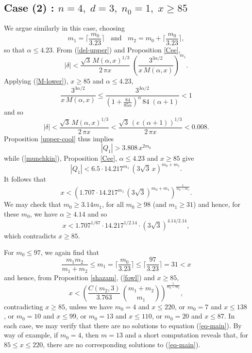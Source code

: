 \subsection{Case (2) : $n=4, \; d=3, \;  n_0=1, \; x \geq 85$}

We argue similarly in this case, choosing
$$
m_1 = \Big\lceil \frac{m_0}{3.23} \Big\rceil \; \; \mbox{ and } \; \; m_2 = m_0+  \Big\lceil \frac{m_0}{3.23} \Big\rceil,
$$
so that $\alpha \leq 4.23$.
From (\ref{del-upper}) and   Proposition \ref{Cee}, 
$$
|\delta| < \frac{\sqrt{3} \, M(\alpha,x)^{1/3}}{2 \, \pi x} \; \left( \frac{3^{3\alpha/2} }{x \, M(\alpha,x)} \right)^{m_1}.
$$
Applying (\ref{M-lower}), $x \geq 85$ and $\alpha \leq 4.23$, 
$$
 \frac{3^{3\alpha/2} }{x \, M(\alpha,x)} \leq \frac{3^{3\alpha/2} }{\left( 1 + \frac{84}{85 \alpha} \right)^\alpha \, 84 \; (\alpha+1)} < 1
$$
and so 
$$
|\delta| < \frac{\sqrt{3} \, M(\alpha,x)^{1/3}}{2 \, \pi x}  < 
\frac{\sqrt{3} \,(e \, (\alpha+1))^{1/3}}{2 \,\pi x}  < 0.008.
$$
Proposition \ref{upper-cool} thus implies 
\begin{equation} \label{fowl}
|Q_1| > 3.808 \, x^{2 m_0}
\end{equation}
while (\ref{munchkin}), Proposition \ref{Cee}, $\alpha \leq 4.23$ and $x \geq 85$ give
$$
|Q_1| < 6.5 \cdot 14.217^{m_1}  \, (3 \sqrt{3} \, x)^{m_0+m_1}.
$$
 It follows that
\begin{equation} \label{kite3}
x < \left( 1.707 \cdot 14.217^{m_1}  \, (3 \sqrt{3})^{m_0+m_1} \right)^{\frac{1}{m_0-m_1}}.
\end{equation}
 We may check that $m_0 \geq 3.14 m_1$, for all $m_0 \geq 98$ (and $m_1 \geq 31$) and hence, for these $m_0$, we have $\alpha \geq 4.14$ and so
 $$
 x < 1.707^{1/67} \cdot 14.217^{1/2.14} \cdot (3 \sqrt{3})^{4.14/2.14},
 $$
 which contradicts $x \geq 85$.
 
 For $m_0 \leq 97$, we again find that
 $$
\frac{m_1m_2}{m_1+m_2} \leq m_1 = \Big\lceil \frac{m_0}{3.23} \Big\rceil \leq   \Big\lceil \frac{97}{3.23} \Big\rceil = 31 < x
$$
 and hence, from Proposition \ref{shazam}, (\ref{fowl}) and $x \geq 85$, 
$$
x < \left( \frac{C(m_2, 3)}{3.763} \, \binom{m_1+m_2}{m_1} \right)^{\frac{1}{m_0-m_1}},
$$
contradicting $x \geq 85$, unless we have $m_0=4$ and $x \leq 220$, or $m_0=7$ and $x \leq 138$, or $m_0=10$ and $x \leq 99$, or $m_0=13$ and $x \leq 110$,
or $m_0=20$ and $x \leq 87$. In each case, we may verify that there are no solutions to equation (\ref{eq-main}). By way of example, if $m_0=4$, then $m=13$ and a short computation reveals that, for $85 \leq x \leq 220$, there are no corresponding solutions to (\ref{eq-main}).

